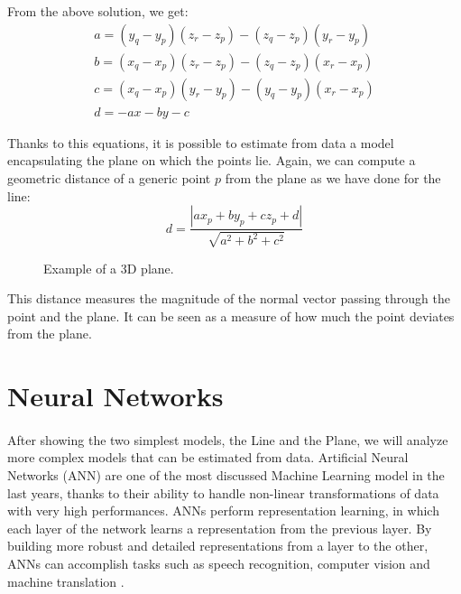 From the above solution, we get:
\begin{equation}
    \begin{gathered}
        a = (y_q - y_p)(z_r - z_p) - (z_q - z_p)(y_r - y_p) \\
        b = (x_q - x_p)(z_r - z_p) - (z_q - z_p)(x_r - x_p) \\
        c = (x_q - x_p)(y_r - y_p) - (y_q - y_p)(x_r - x_p) \\
        d = -ax -by -c
    \end{gathered}
\end{equation}

Thanks to this equations, it is possible to estimate from data a model encapsulating the plane on which the points lie. Again, we can compute a geometric distance of a generic point $p$ from the plane as we have done for the line:
\begin{equation}
    d = \frac{|ax_p + by_p + cz_p + d|}{\sqrt{a^2 + b^2 + c^2}}
\end{equation}

\begin{figure}[htb]
    \centering
    
    \caption{Example of a 3D plane.}
    \label{fig:generic_plane}
\end{figure}

This distance measures the magnitude of the normal vector passing through the point and the plane. It can be seen as a measure of how much the point deviates from the plane.

\section{Neural Networks}
\label{sec:neural-net}
\paragraph{}
After showing the two simplest models, the Line and the Plane, we will analyze more complex models that can be estimated from data. \newline 
Artificial Neural Networks (ANN) are one of the most discussed Machine Learning model in the last years, thanks to their ability to handle non-linear transformations of data with very high performances. ANNs perform representation learning, in which each layer of the network learns a representation from the previous layer. By building more robust and detailed representations from a layer to the other, ANNs can accomplish tasks such as speech recognition, computer vision and machine translation \cite{patel_hands-unsupervised_nodate}.

